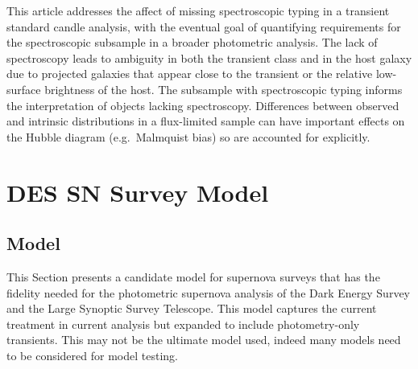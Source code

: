 \documentclass[preprint,3p]{elsarticle}
\begin{document}
This article addresses the affect of missing spectroscopic typing in
a transient standard candle analysis, with the eventual goal of quantifying
requirements for the spectroscopic subsample in a broader photometric analysis.
The lack of spectroscopy leads to ambiguity in both the transient class and
in the host galaxy due to projected galaxies that appear close to the transient or
the relative low-surface brightness of the host.  The subsample with
spectroscopic typing informs the interpretation of objects lacking spectroscopy.
Differences between observed and
intrinsic distributions in a flux-limited sample can have important effects on the Hubble
diagram  (e.g.\ Malmquist bias) so are accounted for explicitly.

\section{DES SN Survey Model}
\label{snIamodel:sec}
\subsection{Model}
This Section presents a candidate model
for supernova surveys that has the fidelity needed for the photometric
supernova analysis of the Dark Energy Survey and the Large Synoptic Survey Telescope.
This model captures the current treatment in current analysis but expanded to include
photometry-only transients.  This may not be the ultimate model used, indeed many models
need to be considered for model testing.
\end{document}
